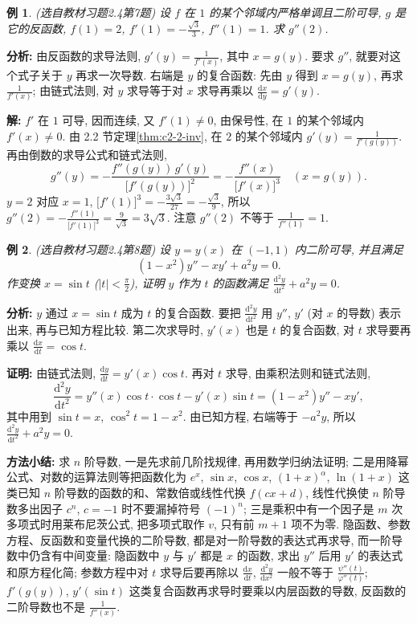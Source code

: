 \documentclass[UTF8,openany]{ctexbook}
\theoremstyle{chinesetextbook}
\newtheorem{example}{例}[section]
\newenvironment{cnproof}{\par\indent\textbf{证明:} \ignorespaces}{\par}
\newenvironment{cnsolution}{\par\indent\textbf{解:} \ignorespaces}{\par}
\newcommand{\dd}{\mathrm d}
\begin{document}
\begin{example}\label{ex:c2-h4-7}
\textnormal{(选自教材习题2.4第7题)} 设 $f$ 在 $1$ 的某个邻域内严格单调且二阶可导, $g$ 是它的反函数, $f(1)=2$, $\displaystyle f'(1)=-\frac{\sqrt3}3$, $f''(1)=1$. 求 $g''(2)$.
\end{example}
\par\indent\textbf{分析:} 由反函数的求导法则, $\displaystyle g'(y)=\frac1{f'(x)}$, 其中 $x=g(y)$. 要求 $g''$, 就要对这个式子关于 $y$ 再求一次导数. 右端是 $y$ 的复合函数: 先由 $y$ 得到 $x=g(y)$, 再求 $\displaystyle\frac1{f'(x)}$; 由链式法则, 对 $y$ 求导等于对 $x$ 求导再乘以 $\displaystyle\frac{\dd x}{\dd y}=g'(y)$.
\begin{cnsolution}
$f'$ 在 $1$ 可导, 因而连续, 又 $f'(1)\ne0$, 由保号性, 在 $1$ 的某个邻域内 $f'(x)\ne0$. 由 2.2 节定理\ref{thm:c2-2-inv}, 在 $2$ 的某个邻域内 $\displaystyle g'(y)=\frac1{f'(g(y))}$. 再由倒数的求导公式和链式法则,
\[
g''(y)=-\frac{f''(g(y))\,g'(y)}{\bigl[f'(g(y))\bigr]^2}=-\frac{f''(x)}{\bigl[f'(x)\bigr]^3}\quad(x=g(y)).
\]
$y=2$ 对应 $x=1$, $\displaystyle\bigl[f'(1)\bigr]^3=-\frac{3\sqrt3}{27}=-\frac{\sqrt3}9$, 所以 $\displaystyle g''(2)=-\frac{f''(1)}{\bigl[f'(1)\bigr]^3}=\frac9{\sqrt3}=3\sqrt3$. 注意 $g''(2)$ 不等于 $\displaystyle\frac1{f''(1)}=1$.
\end{cnsolution}
\begin{example}\label{ex:c2-h4-8}
\textnormal{(选自教材习题2.4第8题)} 设 $y=y(x)$ 在 $(-1,1)$ 内二阶可导, 并且满足
\[
(1-x^2)y''-xy'+a^2y=0.
\]
作变换 $x=\sin t$ ($\displaystyle|t|<\frac\pi2$), 证明 $y$ 作为 $t$ 的函数满足 $\displaystyle\frac{\dd^2y}{\dd t^2}+a^2y=0$.
\end{example}
\par\indent\textbf{分析:} $y$ 通过 $x=\sin t$ 成为 $t$ 的复合函数. 要把 $\displaystyle\frac{\dd^2y}{\dd t^2}$ 用 $y''$, $y'$ (对 $x$ 的导数) 表示出来, 再与已知方程比较. 第二次求导时, $y'(x)$ 也是 $t$ 的复合函数, 对 $t$ 求导要再乘以 $\displaystyle\frac{\dd x}{\dd t}=\cos t$.
\begin{cnproof}
由链式法则, $\displaystyle\frac{\dd y}{\dd t}=y'(x)\cos t$. 再对 $t$ 求导, 由乘积法则和链式法则,
\[
\frac{\dd^2y}{\dd t^2}=y''(x)\cos t\cdot\cos t-y'(x)\sin t=(1-x^2)y''-xy',
\]
其中用到 $\sin t=x$, $\cos^2t=1-x^2$. 由已知方程, 右端等于 $-a^2y$, 所以 $\displaystyle\frac{\dd^2y}{\dd t^2}+a^2y=0$.
\end{cnproof}
\par\indent\textbf{方法小结:} 求 $n$ 阶导数, 一是先求前几阶找规律, 再用数学归纳法证明; 二是用降幂公式、对数的运算法则等把函数化为 $e^x$, $\sin x$, $\cos x$, $(1+x)^\alpha$, $\ln(1+x)$ 这类已知 $n$ 阶导数的函数的和、常数倍或线性代换 $f(cx+d)$, 线性代换使 $n$ 阶导数多出因子 $c^n$, $c=-1$ 时不要漏掉符号 $(-1)^n$; 三是乘积中有一个因子是 $m$ 次多项式时用莱布尼茨公式, 把多项式取作 $v$, 只有前 $m+1$ 项不为零. 隐函数、参数方程、反函数和变量代换的二阶导数, 都是对一阶导数的表达式再求导, 而一阶导数中仍含有中间变量: 隐函数中 $y$ 与 $y'$ 都是 $x$ 的函数, 求出 $y''$ 后用 $y'$ 的表达式和原方程化简; 参数方程中对 $t$ 求导后要再除以 $\displaystyle\frac{\dd x}{\dd t}$, $\displaystyle\frac{\dd^2y}{\dd x^2}$ 一般不等于 $\displaystyle\frac{\psi''(t)}{\varphi''(t)}$; $f'(g(y))$, $y'(\sin t)$ 这类复合函数再求导时要乘以内层函数的导数, 反函数的二阶导数也不是 $\displaystyle\frac1{f''(x)}$.
\end{document}
